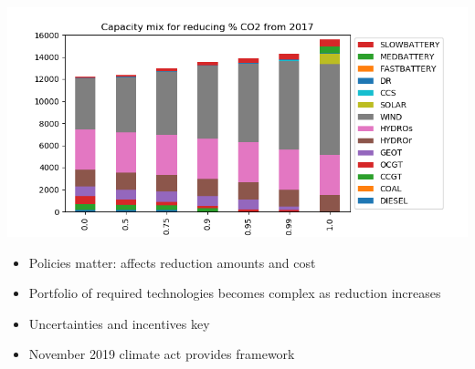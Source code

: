 \documentclass[xcolor=dvipsnames]{beamer}
\newcommand{\exclude}[1]{}
\begin{document}
\begin{frame}
\begin{columns}[T]
    \begin{column}{0.6\linewidth}
      \includegraphics[width=\textwidth]{includes/Sco2rednv20.png}
      \begin{itemize}
      \item Policies matter: affects reduction amounts and cost
      \item Portfolio of required technologies becomes complex as
        reduction increases
      \item Uncertainties and incentives key
      \item November 2019 climate act provides framework
      \end{itemize}
    \end{column}
  \end{columns}

\end{frame}


\exclude{
    Who are we, what are we doing.

  If we think of the goal for this talk as two-fold:  1) to describe
  WEREWOLF and 2) to pique their interest to participate in the policy
  discussion.

I would recommend to keep it high-level description to start and focus on the value proposition to ask them for their involvement.  They can ask you more detailed questions about the model in the Q\&A afterwards if they are interested.

I like the flow so far and the outputs in slides 6-10.  Although, I think we don't need to show them outputs for this meeting, as it is more of a briefing on WEREWOLF, where we are going with it and inviting them to participate if they are interested.

To gather their interest, we should focus on the value proposition for WEREWOLF to help guide government policy and, to some extent, utility investment decisions based on that policy.
}
\end{document}

